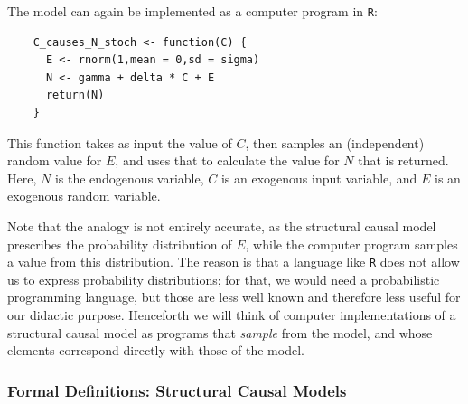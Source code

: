 The model can again be implemented as a computer program in \texttt{R}:
    \begin{lstlisting}
    C_causes_N_stoch <- function(C) {
      E <- rnorm(1,mean = 0,sd = sigma)
      N <- gamma + delta * C + E
      return(N)
    }
    \end{lstlisting}
This function takes as input the value of $C$, then samples an (independent) random 
value for $E$, and uses that to calculate the value for $N$ that is returned.
Here, $N$ is the endogenous variable, $C$ is an exogenous input variable, and $E$ is an exogenous random variable.

Note that the analogy is not entirely accurate, as the structural causal model
prescribes the probability distribution of $E$, while the computer program samples 
a value from this distribution. The reason is that a language like \texttt{R} does
not allow us to express probability distributions; for that, we would need a 
probabilistic programming language, but those are less well known and therefore less
useful for our didactic purpose. Henceforth we will think of computer implementations
of a structural causal model as programs that \emph{sample} from the model, and 
whose elements correspond directly with those of the model.

\subsubsection{Formal Definitions: Structural Causal Models}

